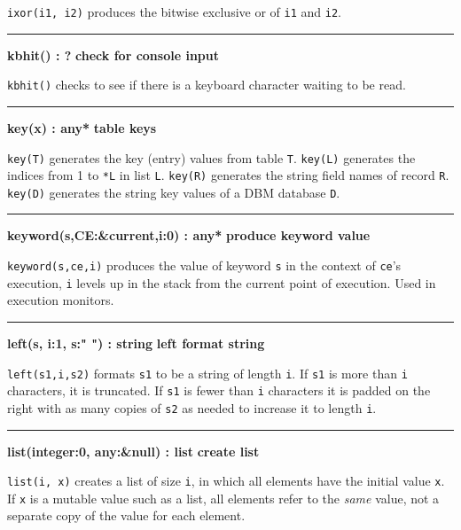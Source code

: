 \noindent
\texttt{ixor(i1, i2)} produces the bitwise exclusive
or of \texttt{i1} and \texttt{i2}.

\bigskip\hrule\vspace{0.1cm}
\noindent
{\bf kbhit() : ? } \hfill {\bf check for console input}

\noindent
{}\texttt{kbhit()} checks to see if there is a
keyboard character waiting to be read.

\bigskip\hrule\vspace{0.1cm}
\noindent
{\bf key(x) : any* } \hfill {\bf table keys}\WarningNotThreadSafe

\noindent
{}\texttt{key(T)} generates the key (entry) values from
table \texttt{T}. \texttt{key(L)} generates the indices from 1 to
\texttt{*L} in list \texttt{L}. \texttt{key(R)} generates the string
field names of record \texttt{R}.
\texttt{key(D)} generates the string key values of a DBM database \texttt{D}.

\bigskip\hrule\vspace{0.1cm}
\noindent
{\bf keyword(s,CE:\&current,i:0) : any* } \hfill {\bf produce keyword value}

\noindent
{}\texttt{keyword(s,ce,i)} produces the value of keyword
\texttt{s} in the context of \texttt{ce}'s execution,
\texttt{i} levels up in the stack from the current point of execution.
Used in execution monitors.

\bigskip\hrule\vspace{0.1cm}
\noindent
{\bf left(s, i:1, s:" ") : string } \hfill {\bf left format string}

\noindent
{}\texttt{left(s1,i,s2)} formats \texttt{s1} to be a string
of length \texttt{i}. If \texttt{s1} is more than \texttt{i}
characters, it is truncated. If \texttt{s1} is fewer than \texttt{i}
characters it is padded on the right with as many copies of \texttt{s2}
as needed to increase it to length \texttt{i}.

\bigskip\hrule\vspace{0.1cm}
\noindent
{\bf list(integer:0, any:\&null) : list } \hfill {\bf create list}

\noindent
{}\texttt{list(i, x)} creates a list of size \texttt{i},
in which all elements have the initial value \texttt{x}. If \texttt{x}
is a mutable value such as a list, all elements refer to the
\textit{same} value, not a separate copy of the value for each element.

